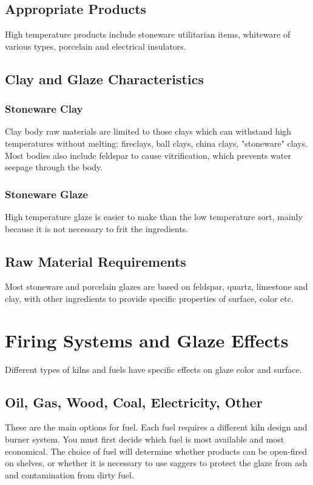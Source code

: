 \subsection{Appropriate Products}
High temperature products include stoneware utilitarian items, whiteware of 
various types, porcelain and electrical insulators.
\subsection{Clay and Glaze Characteristics}
\subsubsection{Stoneware Clay}
Clay body raw materials are limited to those clays which can withstand high 
temperatures without melting: fireclays, ball clays, china clays, "stoneware" 
clays. Most bodies also include feldspar to cause vitrification, which prevents 
water seepage through the body.
\subsubsection{Stoneware Glaze}
High temperature glaze is easier to make than the low temperature sort, mainly 
because it is not necessary to frit the ingredients.
\subsection{Raw Material Requirements}
Most stoneware and porcelain glazes are based on feldspar, quartz, limestone 
and clay, with other ingredients to provide specific properties of surface, 
color etc.
\section{Firing Systems and Glaze Effects}
Different types of kilns and fuels have specific effects on glaze color and 
surface.
\subsection{Oil, Gas, Wood, Coal, Electricity, Other}
These are the main options for fuel. Each fuel requires a different kiln design 
and burner system. You must first decide which fuel is most available and most 
economical. The choice of fuel will determine whether products can be 
open-fired on shelves, or whether it is necessary to use saggers to protect the 
glaze from ash and contamination from dirty fuel.

